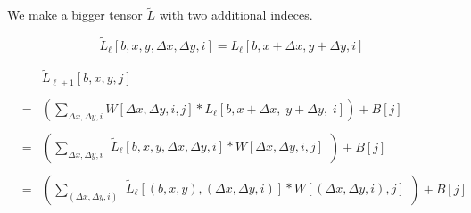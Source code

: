 {\vfill
We make a bigger tensor $\tilde{L}$ with two additional indeces.

$$\tilde{L}_{{\ell}}[b,x,y,\Delta x,\Delta y,i] = L_{{\ell}}[b,x+\Delta x,y+\Delta y,i]$$


\begin{eqnarray*}
  & & \tilde{L}_{{\ell+1}}[b,x,y,j] \\
  \\
  & = & \left(\sum_{\Delta x, \Delta y, i} W[\Delta x, \Delta y, i, j] *L_{{\ell}}[b,x + \Delta x,\; y + \Delta y,\; i]\right) + B[j] \\
  \\
      & = & \left(\sum_{\Delta x, \Delta y, i} \begin{array}{l}
                                              \tilde{L}_{{\ell}}[b,x,y,\Delta x,\Delta y,i]
                                              * W[\Delta x, \Delta y, i, j] \\
  \end{array}\right) + B[j] \\
  \\
    & = & \left(\sum_{(\Delta x, \Delta y, i)} \begin{array}{l}
                                              \tilde{L}_{{\ell}}[(b,x,y),(\Delta x,\Delta y,i)]
                                              * W[(\Delta x, \Delta y, i), j] \\
                                           \end{array}\right) + B[j]
\end{eqnarray*}

}

